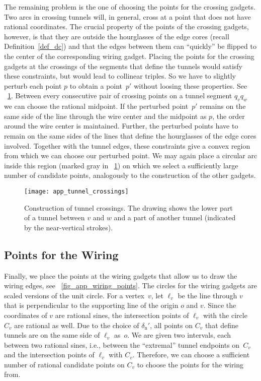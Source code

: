 \documentclass[11pt,a4paper]{article}
\begin{document}
The remaining problem is the one of choosing the points for the crossing gadgets.
Two arcs in crossing tunnels will, in general, cross at a point that does not have rational coordinates.
The crucial property of the points of the crossing gadgets, however, is that they are outside the hourglasses of the edge cores (recall Definition~\ref{def_dc}) and that the edges between them can ``quickly'' be flipped to the center of the corresponding wiring gadget.
Placing the points for the crossing gadgets at the crossings of the segments that define the tunnels would satisfy these constraints, but would lead to collinear triples.
So we have to slightly perturb each point $p$ to obtain a point~$p'$ without loosing these properties.
See \figurename~\ref{fig_app_tunnel_crossings}.
Between every consecutive pair of crossing points on a tunnel segment $q_v q_w$ we can choose the rational midpoint.
If the perturbed point~$p'$ remains on the same side of the line through the wire center and the midpoint as $p$, the order around the wire center is maintained.
Further, the perturbed points have to remain on the same sides of the lines that define the hourglasses of the edge cores involved.
Together with the tunnel edges, these constraints give a convex region from which we can choose our perturbed point.
We may again place a circular arc inside this region (marked gray in \figurename~\ref{fig_app_tunnel_crossings}) on which we select a sufficiently large number of candidate points, analogously to the construction of the other gadgets.

\begin{figure}
\centering
\texttt{[image: app\_tunnel\_crossings]}
\caption{Construction of tunnel crossings. The drawing shows the lower part of a tunnel between $v$ and $w$ and a part of another tunnel (indicated by the near-vertical strokes).}
\label{fig_app_tunnel_crossings}
\end{figure}



\subsection{Points for the Wiring}
Finally, we place the points at the wiring gadgets that allow us to draw the wiring edges, see \figurename~\ref{fig_app_wiring_points}.
The circles for the wiring gadgets are scaled versions of the unit circle.
For a vertex~$v$, let $\ell_{v}$ be the line through $v$ that is perpendicular to the supporting line of the origin $o$ and $v$.
Since the coordinates of $v$ are rational sines, the intersection points of $\ell_{v}$ with the circle~$C_v$ are rational as well.
Due to the choice of $\delta_\mathrm{n}'$, all points on $C_v$ that define tunnels are on the same side of $\ell_{v}$ as~$o$.
We are given two intervals, each between two rational sines, i.e., between the ``extremal'' tunnel endpoints on~$C_v$ and the intersection points of $\ell_{v}$ with $C_v$.
Therefore, we can choose a sufficient number of rational candidate points on $C_v$ to choose the points for the wiring from.
\end{document}

